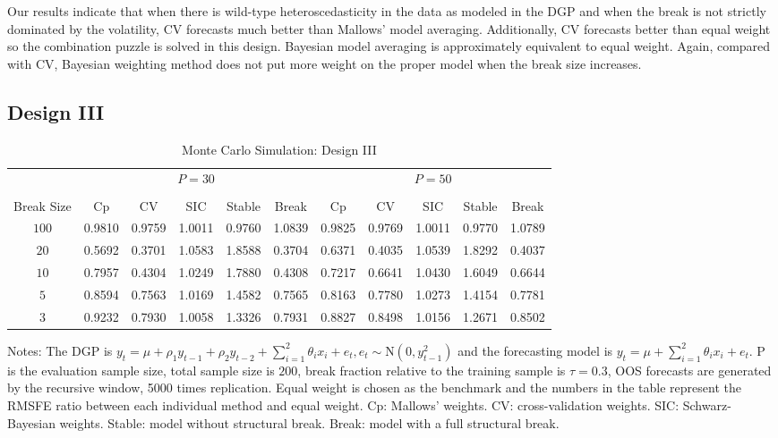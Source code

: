 Our results indicate that when there is wild-type heteroscedasticity in the data as modeled in the DGP and when the break is not strictly dominated by the volatility, CV forecasts much better than Mallows' model averaging. Additionally, CV forecasts better than equal weight so the combination puzzle is solved in this design. Bayesian model averaging is approximately equivalent to equal weight. Again, compared with CV, Bayesian weighting method does not put more weight on the proper model when the break size increases.
\subsection{Design III}
\begin{table}
    \caption{Monte Carlo Simulation: Design III} \label{ntb:3}
    \centering
    \begin{adjustbox}{width=\textwidth,totalheight=\textheight,keepaspectratio}
    \begin{threeparttable}
    \begin{tabular}{ccccccccccc}
    \toprule
     & \multicolumn{5}{c}{$P = 30$} & \multicolumn{5}{c}{$P = 50$} \\
    \cmidrule(r){2-6}
    \cmidrule(r){7-11} \\
    Break Size      & Cp     & CV     & SIC    & Stable & Break  & Cp     & CV     & SIC    & Stable & Break  \\
    $100$           & 0.9810 & 0.9759 & 1.0011 & 0.9760 & 1.0839 & 0.9825 & 0.9769 & 1.0011 & 0.9770 & 1.0789 \\
    $20$            & 0.5692 & 0.3701 & 1.0583 & 1.8588 & 0.3704 & 0.6371 & 0.4035 & 1.0539 & 1.8292 & 0.4037 \\
    $10$            & 0.7957 & 0.4304 & 1.0249 & 1.7880 & 0.4308 & 0.7217 & 0.6641 & 1.0430 & 1.6049 & 0.6644 \\
    $5$             & 0.8594 & 0.7563 & 1.0169 & 1.4582 & 0.7565 & 0.8163 & 0.7780 & 1.0273 & 1.4154 & 0.7781 \\
    $3$             & 0.9232 & 0.7930 & 1.0058 & 1.3326 & 0.7931 & 0.8827 & 0.8498 & 1.0156 & 1.2671 & 0.8502 \\
    \bottomrule
    \end{tabular}
    \begin{tablenotes} \footnotesize
    Notes: The DGP is $y_{t} = \mu + \rho_{1}y_{t-1} + \rho_{2}y_{t-2} + \sum_{i=1}^{2}\theta_{i}x_{i} + e_{t}, e_{t} \sim \mathrm{N}(0, y_{t-1}^{2})$ and the forecasting model is $y_{t} = \mu + \sum_{i=1}^{2}\theta_{i}x_{i} + e_{t}$. $\mathrm{P}$ is the evaluation sample size, total sample size is $200$, break fraction relative to the training sample is $\tau = 0.3$, OOS forecasts are generated by the recursive window, 5000 times replication. Equal weight is chosen as the benchmark and the numbers in the table represent the RMSFE ratio between each individual method and equal weight. Cp: Mallows' weights. CV: cross-validation weights. SIC: Schwarz-Bayesian weights. Stable: model without structural break. Break: model with a full structural break.
    \end{tablenotes}
    \end{threeparttable}
    \end{adjustbox}
\end{table}
